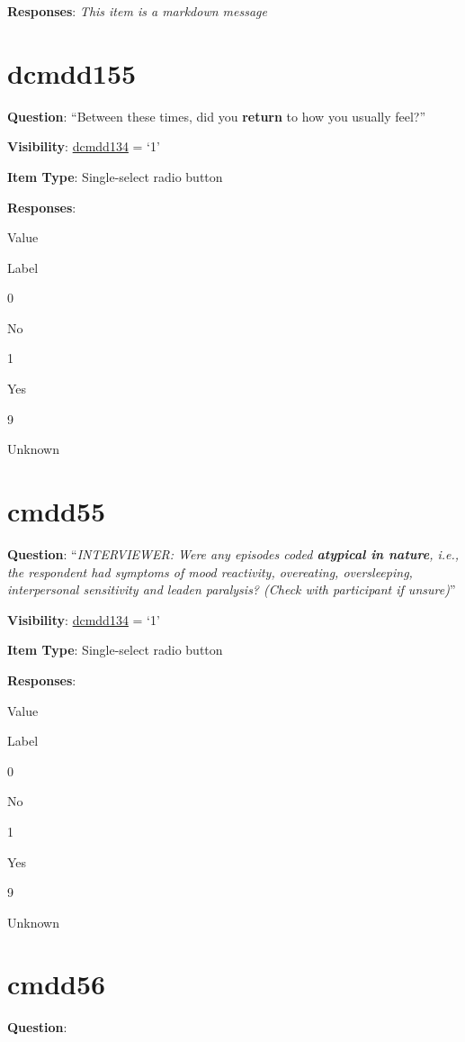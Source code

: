 \documentclass[]{book}
\begin{document}
\textbf{Responses}: \emph{This item is a markdown message}

\hypertarget{dcmdd155}{%
\section{dcmdd155}\label{dcmdd155}}

\textbf{Question}: ``Between these times, did you \textbf{return} to how you usually feel?''

\textbf{Visibility}: \protect\hyperlink{dcmdd134}{dcmdd134} = `1'

\textbf{Item Type}: Single-select radio button

\textbf{Responses}:

Value

Label

0

No

1

Yes

9

Unknown

\hypertarget{cmdd55}{%
\section{cmdd55}\label{cmdd55}}

\textbf{Question}: ``\emph{INTERVIEWER: Were any episodes coded \textbf{atypical in nature}, i.e., the respondent had symptoms of mood reactivity, overeating, oversleeping, interpersonal sensitivity and leaden paralysis? (Check with participant if unsure)}''

\textbf{Visibility}: \protect\hyperlink{dcmdd134}{dcmdd134} = `1'

\textbf{Item Type}: Single-select radio button

\textbf{Responses}:

Value

Label

0

No

1

Yes

9

Unknown

\hypertarget{cmdd56}{%
\section{cmdd56}\label{cmdd56}}

\textbf{Question}:
\end{document}
